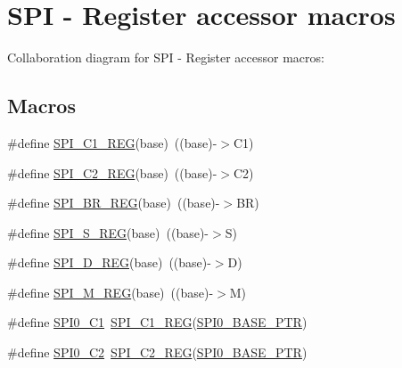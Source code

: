 \hypertarget{group___s_p_i___register___accessor___macros}{}\section{S\+PI -\/ Register accessor macros}
\label{group___s_p_i___register___accessor___macros}
Collaboration diagram for S\+PI -\/ Register accessor macros\+:
\subsection*{Macros}
\begin{DoxyCompactItemize}
\item 
\#define \hyperlink{group___s_p_i___register___accessor___macros_gaab10c0d68bf4bf1d9906c39b1ed053b1}{S\+P\+I\+\_\+\+C1\+\_\+\+R\+EG}(base)~((base)-\/$>$C1)
\item 
\#define \hyperlink{group___s_p_i___register___accessor___macros_ga74470421e50ddfa892f20557aac775a0}{S\+P\+I\+\_\+\+C2\+\_\+\+R\+EG}(base)~((base)-\/$>$C2)
\item 
\#define \hyperlink{group___s_p_i___register___accessor___macros_ga6cf6551cb2fa5b60d6dfbe7544ef7ec7}{S\+P\+I\+\_\+\+B\+R\+\_\+\+R\+EG}(base)~((base)-\/$>$BR)
\item 
\#define \hyperlink{group___s_p_i___register___accessor___macros_ga19d81f95fe621c7c2a42a6686131f9c2}{S\+P\+I\+\_\+\+S\+\_\+\+R\+EG}(base)~((base)-\/$>$S)
\item 
\#define \hyperlink{group___s_p_i___register___accessor___macros_ga78694fa47ead59b8be3620b96600a223}{S\+P\+I\+\_\+\+D\+\_\+\+R\+EG}(base)~((base)-\/$>$D)
\item 
\#define \hyperlink{group___s_p_i___register___accessor___macros_ga1647c87dc9d038f003a2c3456aa6c508}{S\+P\+I\+\_\+\+M\+\_\+\+R\+EG}(base)~((base)-\/$>$M)
\item 
\#define \hyperlink{group___s_p_i___register___accessor___macros_ga2b777381f1ec71e064b9de35c6dd8dd1}{S\+P\+I0\+\_\+\+C1}~\hyperlink{group___s_p_i___register___accessor___macros_gaab10c0d68bf4bf1d9906c39b1ed053b1}{S\+P\+I\+\_\+\+C1\+\_\+\+R\+EG}(\hyperlink{group___s_p_i___peripheral_ga851f64a97b5919c1f99a34db5918b3b4}{S\+P\+I0\+\_\+\+B\+A\+S\+E\+\_\+\+P\+TR})
\item 
\#define \hyperlink{group___s_p_i___register___accessor___macros_gaead596270d47a58d92c5c7f9ca5bb712}{S\+P\+I0\+\_\+\+C2}~\hyperlink{group___s_p_i___register___accessor___macros_ga74470421e50ddfa892f20557aac775a0}{S\+P\+I\+\_\+\+C2\+\_\+\+R\+EG}(\hyperlink{group___s_p_i___peripheral_ga851f64a97b5919c1f99a34db5918b3b4}{S\+P\+I0\+\_\+\+B\+A\+S\+E\+\_\+\+P\+TR})

\end{DoxyCompactItemize}
